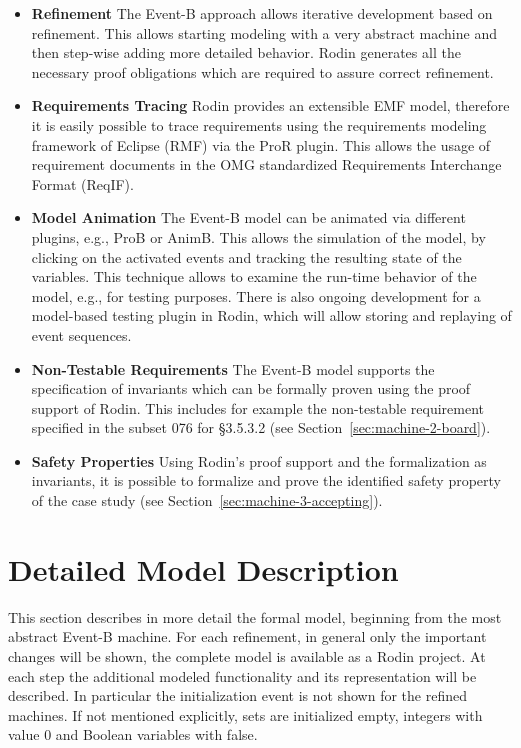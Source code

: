 \documentclass{template/openetcs_article}
\begin{document}
\begin{itemize}
\item {\bf Refinement} The Event-B approach allows iterative development based
  on refinement. This allows starting modeling with a very abstract machine and
  then step-wise adding more detailed behavior. Rodin generates all the
  necessary proof obligations which are required to assure correct refinement.
\item {\bf Requirements Tracing} Rodin provides an extensible EMF model,
  therefore it is easily possible to trace requirements using the requirements
  modeling framework of Eclipse (RMF) via the ProR plugin. This allows the usage
  of requirement documents in the OMG standardized Requirements Interchange
  Format (ReqIF).
\item {\bf Model Animation} The Event-B model can be animated via different
  plugins, e.g., ProB or AnimB. This allows the simulation of the model, by
  clicking on the activated events and tracking the resulting state of the
  variables. This technique allows to examine the run-time behavior of the
  model, e.g., for testing purposes. There is also ongoing development for a
  model-based testing plugin in Rodin, which will allow storing and replaying of
  event sequences.
\item {\bf Non-Testable Requirements} The Event-B model supports the
  specification of invariants which can be formally proven using the proof
  support of Rodin. This includes for example the non-testable requirement
  specified in the subset 076 for §3.5.3.2 (see
  Section~\ref{sec:machine-2-board}).
\item {\bf Safety Properties} Using Rodin's proof support and the formalization
  as invariants, it is possible to formalize and prove the identified safety
  property of the case study (see Section~\ref{sec:machine-3-accepting}).
\end{itemize}

\section{Detailed Model Description}
\label{sec:deta-model-descr}

This section describes in more detail the formal model, beginning from the most
abstract Event-B machine. For each refinement, in general only the important
changes will be shown, the complete model is available as a Rodin project. At
each step the additional modeled functionality and its representation will be
described.  In particular the initialization event is not shown for the refined
machines. If not mentioned explicitly, sets are initialized empty, integers with
value 0 and Boolean variables with false.
\end{document}
